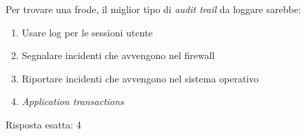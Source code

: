 \begin{Exercise} [
  title={Quiz},
  label={esSFDP7}
  ]

  \Question Per trovare una frode, il miglior tipo di \textit{audit trail} da 
loggare sarebbe:
\begin{enumerate}
 \item Usare log per le sessioni utente
 \item Segnalare incidenti che avvengono nel firewall
 \item Riportare incidenti che avvengono nel sistema operativo
 \item \textit{Application transactions}
\end{enumerate}
  
\end{Exercise}

\begin{Answer} [
  ref={esSFDP7},
  number={7}
  ]

  \Question Risposta esatta: 4
\end{Answer}
